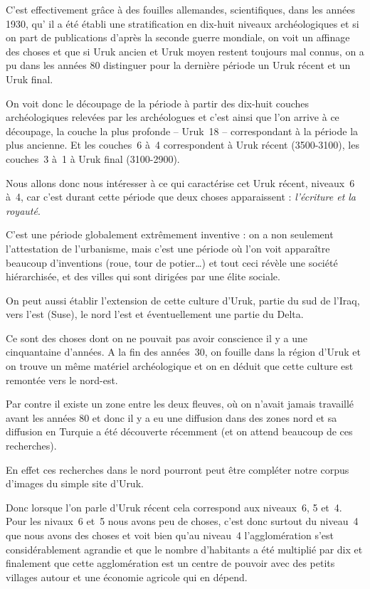 \documentclass[a4paper,10pt]{article}
\begin{document}
C'est effectivement grâce à des fouilles allemandes, scientifiques, 
dans les années 1930, qu' il a été établi une stratification en dix-huit 
niveaux archéologiques et si on part de publications d'après la seconde 
guerre mondiale, on voit un affinage des choses et que si Uruk ancien et 
Uruk moyen restent toujours mal connus, on a pu dans les années 80 
distinguer pour la dernière période un Uruk récent et un Uruk final.

On voit donc le découpage de la période à partir des dix-huit couches 
archéologiques relevées par les archéologues et c'est ainsi que l'on 
arrive à ce découpage, la couche la plus profonde -- Uruk~18 -- 
correspondant à la période la plus ancienne.
Et les couches~6 à~4 correspondent à Uruk récent (3500-3100), 
les couches~3 à~1 à Uruk final (3100-2900).

Nous allons donc nous intéresser à ce qui caractérise cet Uruk récent, 
niveaux~6 à~4, car c'est durant cette période que deux choses apparaissent : 
\emph{l'écriture et la royauté}.

C'est une période globalement extrêmement inventive : on a non seulement 
l'attestation de l'urbanisme, mais c'est une période où l'on voit apparaître 
beaucoup d'inventions (roue, tour de potier\dots) et tout ceci révèle une 
société hiérarchisée, et des villes qui sont dirigées par une élite sociale.

On peut aussi établir l'extension de cette culture d'Uruk, partie du sud 
de l'Iraq, vers l'est (Suse), le nord l'est et éventuellement une partie 
du Delta.

Ce sont des choses dont on ne pouvait pas avoir conscience il y a une 
cinquantaine d'années. A la fin des années~30, on fouille dans la région 
d'Uruk et on trouve un même matériel archéologique et on en déduit que 
cette culture est remontée vers le nord-est.

Par contre il existe un zone entre les deux fleuves, où on n'avait jamais 
travaillé avant les années 80 et donc il y a eu une diffusion dans des 
zones nord et sa diffusion en Turquie a été découverte récemment (et on 
attend beaucoup de ces recherches).

En effet ces recherches dans le nord pourront peut être compléter notre 
corpus d'images du simple site d'Uruk.

Donc lorsque l'on parle d'Uruk récent cela correspond aux niveaux~6, 
5 et~4. Pour les nivaux~6 et~5 nous avons peu de choses, c'est donc 
surtout du niveau~4 que nous avons des choses et voit bien qu'au niveau~4 
l'agglomération s'est considérablement agrandie et que le nombre d'habitants 
a été multiplié par dix et finalement que cette agglomération est un centre 
de pouvoir avec des petits villages autour et une économie agricole qui 
en dépend.
\end{document}
